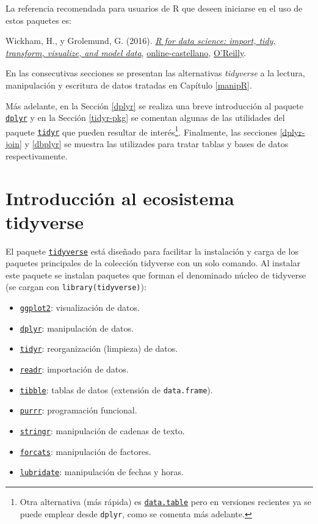 \documentclass[
]{book}
\providecommand{\tightlist}{%
  \setlength{\itemsep}{0pt}\setlength{\parskip}{0pt}}
\theoremstyle{break}
\theoremstyle{nonumberplain}
\let\oldfootnote\footnote
\renewcommand\footnote[1]{\oldfootnote{\hspace{2mm}#1}}
\begin{document}
La referencia recomendada para usuarios de R que deseen iniciarse en el uso de estos paquetes es:

Wickham, H., y Grolemund, G. (2016). \emph{\href{http://r4ds.had.co.nz}{R for data science: import, tidy, transform, visualize, and model data}}, \href{https://es.r4ds.hadley.nz}{online-castellano}, \href{http://shop.oreilly.com/product/0636920034407.do}{O'Reilly}.

En las consecutivas secciones se presentan las alternativas \emph{tidyverse} a la lectura, manipulación y escritura de datos tratadas en Capítulo \ref{manipR}.

Más adelante, en la Sección \ref{dplyr} se realiza una breve introducción al paquete \href{https://dplyr.tidyverse.org}{\texttt{dplyr}} y en la Sección \ref{tidyr-pkg} se comentan algunas de las utilidades del paquete \href{https://tidyr.tidyverse.org}{\texttt{tidyr}} que pueden resultar de interés\footnote{Otra alternativa (más rápida) es \href{https://rdatatable.gitlab.io/data.table}{\texttt{data.table}} pero en versiones recientes ya se puede emplear desde \texttt{dplyr}, como se comenta más adelante.}. Finalmente, las secciones \ref{dplyr-join} y \ref{dbplyr} se muestra las utilizades para tratar tablas y bases de datos respectivamente.

\section{Introducción al ecosistema tidyverse}\label{introTidyverse}

El paquete \href{https://tidyverse.tidyverse.org}{\texttt{tidyverse}} está diseñado para facilitar la instalación y carga de los paquetes principales de la colección tidyverse con un solo comando.
Al instalar este paquete se instalan paquetes que forman el denominado núcleo de tidyverse (se cargan con \texttt{library(tidyverse)}):

\begin{itemize}
\tightlist
\item
  \href{https://ggplot2.tidyverse.org}{\texttt{ggplot2}}: visualización de datos.
\item
  \href{https://dplyr.tidyverse.org}{\texttt{dplyr}}: manipulación de datos.
\item
  \href{https://tidyr.tidyverse.org}{\texttt{tidyr}}: reorganización (limpieza) de datos.
\item
  \href{https://readr.tidyverse.org}{\texttt{readr}}: importación de datos.
\item
  \href{https://tibble.tidyverse.org}{\texttt{tibble}}: tablas de datos (extensión de \texttt{data.frame}).
\item
  \href{https://purrr.tidyverse.org}{\texttt{purrr}}: programación funcional.
\item
  \href{https://github.com/tidyverse/stringr}{\texttt{stringr}}: manipulación de cadenas de texto.
\item
  \href{https://github.com/tidyverse/forcats}{\texttt{forcats}}: manipulación de factores.
\item
  \href{https://github.com/tidyverse/lubridate}{\texttt{lubridate}}: manipulación de fechas y horas.
\end{itemize}
\end{document}

